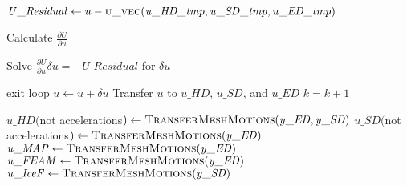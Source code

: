 \documentclass[10pt,letterpaper,oneside,notitlepage]{article}
\begin{document}
\begin{algorithmic}[1]
		\State
		\State$\mathit{U\_Residual} \gets u - \Call{u\_vec}{\mathit{u\_HD\_tmp},\mathit{u\_SD\_tmp},\mathit{u\_ED\_tmp}}$
		\State
		
			\State Calculate $\frac{\partial U}{\partial u}$
		\EndIf
		

		\State Solve  $\frac{\partial U}{\partial u} \delta u = - \mathit{U\_Residual}$ for $\delta u$

		\State    
		 
			\State exit loop
		\EndIf
		\State
		\State $u \gets u + \delta u$
		\State Transfer $u$ to $\mathit{u\_HD}$, $\mathit{u\_SD}$, and $\mathit{u\_ED}$
		\State $k=k+1$
		
	\EndLoop	
	
	\State{}
	\State 
	
	\State$\mathit{u\_HD}($not accelerations$) \gets \Call{TransferMeshMotions}{\mathit{y\_ED},\mathit{y\_SD}}$
	\State$\mathit{u\_SD}($not accelerations$) \gets \Call{TransferMeshMotions}{\mathit{y\_ED}}$
  \State 
	\State $\mathit{u\_MAP}  \gets \Call{TransferMeshMotions}{\mathit{y\_ED}}$
	\State $\mathit{u\_FEAM} \gets \Call{TransferMeshMotions}{\mathit{y\_ED}}$
	\State $\mathit{u\_IceF} \gets \Call{TransferMeshMotions}{\mathit{y\_SD}}$
			
\EndProcedure

\end{algorithmic}
\end{document}
